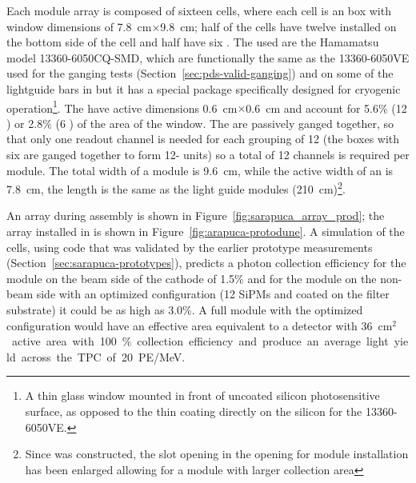 Each   module array is composed of sixteen cells, where each cell is an  box with window dimensions of \SI{7.8}{cm}$\times$\SI{9.8}{cm}; half of the cells have twelve  installed on the bottom side of the cell and  half have six . The  used are the Hamamatsu model 13360-6050CQ-SMD, which are functionally the same as the 13360-6050VE used for the ganging tests (Section~\ref{sec:pds-valid-ganging}) and on some of the lightguide bars in  but it has a special package specifically designed for cryogenic operation\footnote{A thin glass window mounted in front of uncoated silicon photosensitive surface, as opposed to the thin coating directly on the silicon for the 13360-6050VE.}. 
The  have active dimensions \SI{0.6}{cm}$\times$\SI{0.6}{cm} and account for 5.6\% (\num{12} ) or \num{2.8}\% (\num{6} ) of the area of the window.
The   are passively ganged together, so that only one readout channel is needed for each  grouping of \num{12}  (the boxes with six  are ganged together to form \num{12}- units) so a total of \num{12} channels is required per module. 
The total width of a module is \SI{9.6}{cm}, while the active width of an  is \SI{7.8}{cm}, the length is the same as the light guide modules (\SI{210}{cm})\footnote{Since  was constructed, the slot opening in the  opening for  module installation has been enlarged allowing for a module with larger collection area}.


An  array during assembly is shown in Figure~\ref{fig:sarapuca_array_prod}; the array installed in  is shown in Figure~\ref{fig:arapuca-protodune}. 
A simulation of the  cells, using code that was validated by the earlier prototype measurements (Section~\ref{sec:sarapuca-prototypes}), predicts a photon collection efficiency for the module on the beam side of the cathode of 1.5\% and for the module on the non-beam side with an optimized configuration (\num{12} SiPMs and  coated on the filter substrate) it could be as high as 3.0\%. A full  module with the optimized configuration would have an effective area equivalent to a detector with \SI{36}{cm$^2$} active area with 100\% collection efficiency and produce an average light yield across the TPC of \SI{20}{PE/MeV}.

